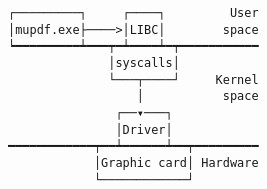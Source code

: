 \documentclass[varwidth,crop]{standalone}
\begin{document}
\begin{verbatim}
┌─────────┐     ┌────┐         User
│mupdf.exe├────>│LIBC│        space
┕━━━━━━━━━┷━━━┯━┷━━━━┷━┯━━━━━━━━━━━
              │syscalls│
              └───┬────┘     Kernel
                  │           space
               ┌──▾───┐
               │Driver│
━━━━━━━━━━━━┯━━┷━━━━━━┷━━┯━━━━━━━━━
            │Graphic card│ Hardware
            └────────────┘
\end{verbatim}
\end{document}
